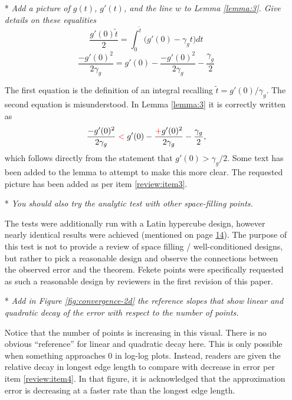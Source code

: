 \begin{itemize}[leftmargin=.5cm]
\newpage\setcounter{page}{0}\thispagestyle{empty}
\item[*] {\it Add a picture of $g(t)$, $g'(t)$, and the line $w$ to Lemma \ref{lemma:3}. Give details on these equalities}
  $$ \frac{g'(0) \tilde t}{2} = \int_0^{\tilde t} \bigl( g'(0) - \gamma_g t \bigr) dt$$
  $$ \frac{-g'(0)^2}{2 \gamma_g} = g'(0) - \frac{-g'(0)^2}{2 \gamma_g} - \frac{\gamma_g}{2}$$
\vspace{.2cm}

The first equation is the definition of an integral recalling $\tilde t = g'(0) / \gamma_g$. The second equation is misunderstood. In Lemma \ref{lemma:3} it is correctly written as
  $$ \frac{-g'(0)^2}{2 \gamma_g} \color{red}<\color{black} g'(0) - \frac{\color{red}+\color{black} g'(0)^2}{2 \gamma_g} - \frac{\gamma_g}{2},$$ \newline\noindent which follows directly from the statement that $g'(0) > \gamma_g / 2$. Some text has been added to the lemma to attempt to make this more clear. The requested picture has been added as per item \ref{review:item3}.

\item[*] {\it You should also try the analytic test with other space-filling points.}\vspace{.2cm}

The tests were additionally run with a Latin hypercube design, however nearly identical results were achieved (mentioned on page \hyperlink{page.14}{14}). The purpose of this test is not to provide a review of space filling / well-conditioned designs, but rather to pick a reasonable design and observe the connections between the observed error and the theorem. Fekete points were specifically requested as such a reasonable design by reviewers in the first revision of this paper.

\item[*] {\it Add in Figure \ref{fig:convergence-2d} the reference slopes that show linear and quadratic decay of the error with respect to the number of points.}\vspace{.2cm}

Notice that the number of points is increasing in this visual. There is no obvious ``reference'' for linear and quadratic decay here. This is only possible when something approaches 0 in log-log plots. Instead, readers are given the relative decay in longest edge length to compare with decrease in error per item \ref{review:item4}. In that figure, it is acknowledged that the approximation error is decreasing at a faster rate than the longest edge length.


\end{itemize}
